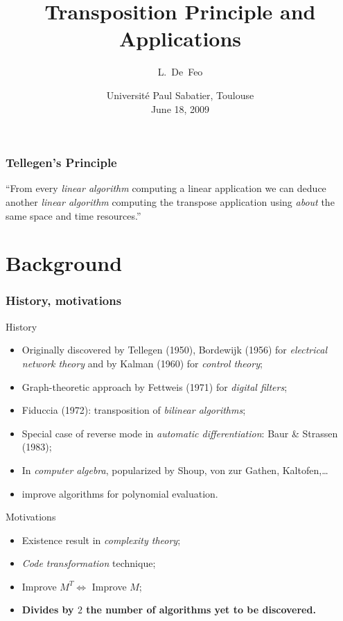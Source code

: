 \documentclass[10pt]{beamer}
\title{Transposition Principle and Applications}
\author{L.~De~Feo}
\institute[TANC, LIX]{Projet TANC, LIX, École Polytechnique}
\date[Toulouse, June 18, 2009]{Université Paul Sabatier,
  Toulouse\\June 18, 2009}
\begin{document}
\begin{frame}
  \titlepage
\end{frame}


\begin{frame}
  \frametitle{Tellegen's Principle}

  \Large
  \begin{center}
    ``From every \emph{linear algorithm} computing a
    linear application we can deduce another \emph{linear algorithm}
    computing the transpose application using \emph{about} the same
    space and time resources.''
  \end{center}
\end{frame}

\section{Background}

\begin{frame}
  \frametitle{History, motivations}
  
  \begin{block}{History}
    \begin{itemize}
    \item Originally discovered by \alert{Tellegen (1950)},
      \alert{Bordewijk (1956)} for \emph{electrical network theory}
      and by \alert{Kalman (1960)} for \emph{control theory};
    \item Graph-theoretic approach by \alert{Fettweis (1971)} for
      \emph{digital filters};
    \item \alert{Fiduccia (1972)}: transposition of \emph{bilinear
      algorithms};
    \item Special case of reverse mode in \emph{automatic differentiation}:
      \alert{Baur \& Strassen (1983)};
    \item In \emph{computer algebra}, popularized by \alert{Shoup},
      \alert{von zur Gathen}, \alert{Kaltofen},\dots
    \item \alert{\cite{BLS03}} improve algorithms for
      polynomial evaluation.
    \end{itemize}
  \end{block}
  
  \begin{block}{Motivations}
    \begin{itemize}
    \item Existence result in \emph{complexity theory};
    \item \emph{Code transformation} technique;
    \item Improve $M^T \Leftrightarrow$ Improve $M$;
    \item {\bf Divides by $2$ the number of algorithms yet to be discovered.}
    \end{itemize}
  \end{block}
\end{frame}
\end{document}
